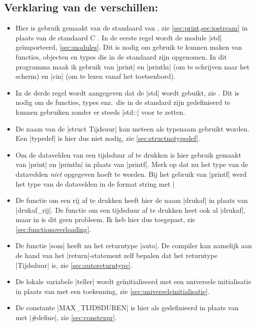 \begin{cpplstShortInline}
\subsection*{Verklaring van de verschillen:}
\begin{itemize}
    \item
    Hier is gebruik gemaakt van de standaard  van \Cpp{}, zie \cref{sec:print,sec:iostream} in plaats van de standaard C .
	In de eerste regel wordt de module |std| geïmporteerd, \cref{sec:modules}.
	Dit is nodig om gebruik te kunnen maken van functies, objecten en types die in de standaard \Cpp{}  zijn opgenomen.
	In dit programma maak ik gebruik van |print| en |println| (om te schrijven naar het scherm) en |cin| (om te lezen vanaf het toetsenbord).
	\item
	In de derde regel wordt aangegeven dat de  |std| wordt gebuikt, zie .
	Dit is nodig om de functies, types enz.\ die in de standard \Cpp{}  zijn gedefinieerd te kunnen gebruiken zonder er steeds |std::| voor te zetten.
    \item 
    De naam van de |struct Tijdsuur| kan meteen als typenaam gebruikt worden. Een |typedef| is hier dus niet nodig, zie \cref{sec:structnotypedef}.
    \item 
    Om de datavelden van een tijdsduur af te drukken is hier gebruik gemaakt van |print| en |println| in plaats van |printf|.
	Merk op dat nu het type van de datavelden \emph{niet} opgegeven hoeft te worden.
	Bij het gebruik van |printf| werd het type van de datavelden in de format string met |%
    \item 
    De functie om een rij af te drukken heeft hier de naam |drukaf| in plaats van |drukaf_rij|.
	De functie om een tijdsduur af te drukken heet ook al |drukaf|, maar in \Cpp{} is dit geen probleem.
	Ik heb hier dus  toegepast, zie \cref{sec:functionoverloading}.
    \item
    De functie |som| heeft nu het returntype |auto|.
    De compiler kan namelijk aan de hand van het |return|\hyp{}statement zelf bepalen dat het returntype |Tijdsduur| is, zie \cref{sec:autoreturntype}.
    \item 
    De lokale variabele |teller| wordt geïnitialiseerd met een universele initialisatie in plaats van met een toekenning, zie \cref{sec:universeleinitialisatie}.
    \item 
    De  constante |MAX_TIJDSDUREN| is hier als  gedefinieerd in plaats van met |#define|, zie \cref{sec:constexpr}.

\end{itemize}
\end{cpplstShortInline}

